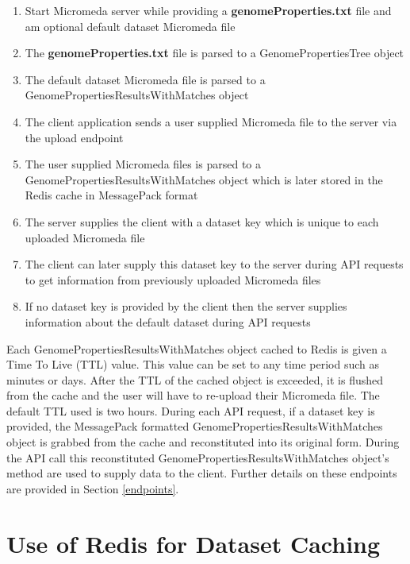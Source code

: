 \begin{enumerate}
  \item Start Micromeda server while providing a \textbf{genomeProperties.txt} file and am optional default dataset Micromeda file
  \item The \textbf{genomeProperties.txt} file is parsed to a GenomePropertiesTree object
  \item The default dataset Micromeda file is parsed to a GenomePropertiesResultsWithMatches object
  \item The client application sends a user supplied Micromeda file to the server via the upload endpoint
  \item The user supplied Micromeda files is parsed to a GenomePropertiesResultsWithMatches object which is later stored in the Redis cache in MessagePack format
  \item The server supplies the client with a dataset key which is unique to each uploaded Micromeda file
  \item The client can later supply this dataset key to the server during API requests to get information from previously uploaded Micromeda files
  \item If no dataset key is provided by the client then the server supplies information about the default dataset during API requests
\end{enumerate}

Each GenomePropertiesResultsWithMatches object cached to Redis is given a Time To Live (TTL) value. This value can be set to any time period such as minutes or days. After the TTL of the cached object is exceeded, it is flushed from the cache and the user will have to re-upload their Micromeda file. The default TTL used is two hours. During each API request, if a dataset key is provided, the MessagePack formatted GenomePropertiesResultsWithMatches object is grabbed from the cache and reconstituted into its original form. During the API call this reconstituted GenomePropertiesResultsWithMatches object's method are used to supply data to the client. Further details on these endpoints are provided in Section \ref{endpoints}.

\section{Use of Redis for Dataset Caching}

